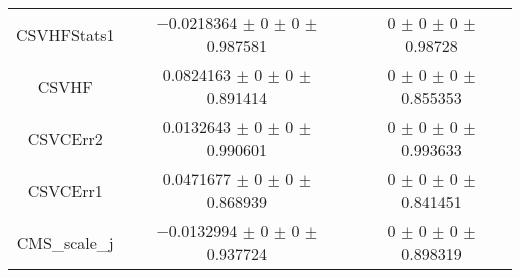 \begin{table}
\begin{tabular}{ccc}
CSVHFStats1 	& \num{-0.0218364} $\pm$ \num{0} $\pm$ \num{0} $\pm$ \num{0.987581} 	& \num{0} $\pm$ \num{0} $\pm$ \num{0} $\pm$ \num{0.98728}\\
CSVHF 	& \num{0.0824163} $\pm$ \num{0} $\pm$ \num{0} $\pm$ \num{0.891414} 	& \num{0} $\pm$ \num{0} $\pm$ \num{0} $\pm$ \num{0.855353}\\
CSVCErr2 	& \num{0.0132643} $\pm$ \num{0} $\pm$ \num{0} $\pm$ \num{0.990601} 	& \num{0} $\pm$ \num{0} $\pm$ \num{0} $\pm$ \num{0.993633}\\
CSVCErr1 	& \num{0.0471677} $\pm$ \num{0} $\pm$ \num{0} $\pm$ \num{0.868939} 	& \num{0} $\pm$ \num{0} $\pm$ \num{0} $\pm$ \num{0.841451}\\
CMS\_scale\_j 	& \num{-0.0132994} $\pm$ \num{0} $\pm$ \num{0} $\pm$ \num{0.937724} 	& \num{0} $\pm$ \num{0} $\pm$ \num{0} $\pm$ \num{0.898319}\\
\bottomrule
\end{tabular}
\end{table}